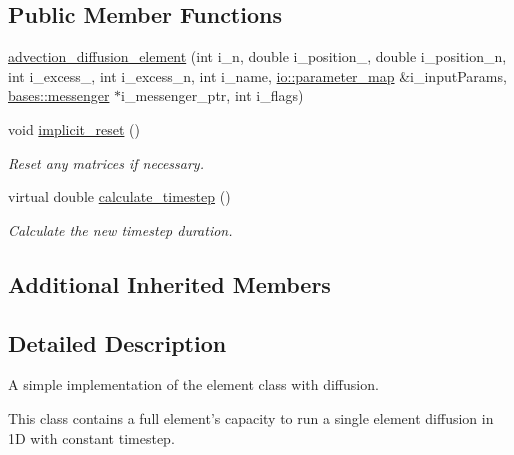 \subsection*{Public Member Functions}
\begin{DoxyCompactItemize}
\item 
\hyperlink{classone__d_1_1chebyshev_1_1advection__diffusion__element_aab3b41c17eb8806d8040ba75b03ed613}{advection\-\_\-diffusion\-\_\-element} (int i\-\_\-n, double i\-\_\-position\-\_, double i\-\_\-position\-\_\-n, int i\-\_\-excess\-\_, int i\-\_\-excess\-\_\-n, int i\-\_\-name, \hyperlink{namespaceio_a1c55c654666eeece6a9724f453fdbd87}{io\-::parameter\-\_\-map} \&i\-\_\-input\-Params, \hyperlink{classbases_1_1messenger}{bases\-::messenger} $\ast$i\-\_\-messenger\-\_\-ptr, int i\-\_\-flags)
\begin{DoxyCompactList}\small\item\em \end{DoxyCompactList}\item 
void \hyperlink{classone__d_1_1chebyshev_1_1advection__diffusion__element_a9f38631c75ee45cda5ce33ee51bddfc8}{implicit\-\_\-reset} ()
\begin{DoxyCompactList}\small\item\em Reset any matrices if necessary. \end{DoxyCompactList}\item 
virtual double \hyperlink{classone__d_1_1chebyshev_1_1advection__diffusion__element_a935392ea158d867bcc28733c72e3c9ae}{calculate\-\_\-timestep} ()
\begin{DoxyCompactList}\small\item\em Calculate the new timestep duration. \end{DoxyCompactList}\end{DoxyCompactItemize}
\subsection*{Additional Inherited Members}


\subsection{Detailed Description}
A simple implementation of the element class with diffusion. 



 This class contains a full element's capacity to run a single element diffusion in 1\-D with constant timestep. 

